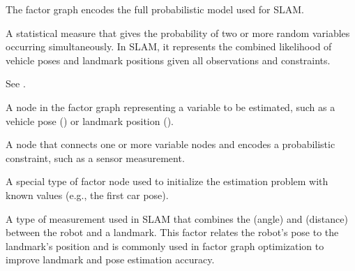 \documentclass[letterpaper,10pt,english]{sphinxmanual}
\begin{document}
\begin{description}
\begin{itemize}
\end{itemize}

\sphinxAtStartPar
The factor graph encodes the full probabilistic model used for SLAM.

\sphinxAtStartPar
A statistical measure that gives the probability of two or more random variables occurring simultaneously. In SLAM, it represents the combined likelihood of vehicle poses and landmark positions given all observations and constraints.

\sphinxAtStartPar
See {\hyperref[\detokenize{glossary:term-Joint-probability-distribution}]{}}.

\sphinxAtStartPar
A node in the factor graph representing a variable to be estimated, such as a vehicle pose () or landmark position ().

\sphinxAtStartPar
A node that connects one or more variable nodes and encodes a probabilistic constraint, such as a sensor measurement.

\sphinxAtStartPar
A special type of factor node used to initialize the estimation problem with known values (e.g., the first car pose).

\sphinxAtStartPar
A type of measurement used in SLAM that combines the  (angle) and  (distance) between the robot and a landmark. This factor relates the robot’s pose to the landmark’s position and is commonly used in factor graph optimization to improve landmark and pose estimation accuracy.


\end{description}
\end{document}
